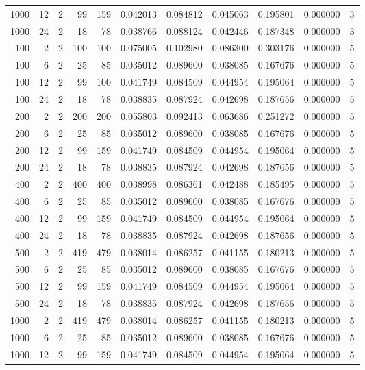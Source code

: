\begin{table}
\begin{tabular}{rrrrrrrrrrr}
1000 & 12 & 2 & 99 & 159 & 0.042013 & 0.084812 & 0.045063 & 0.195801 & 0.000000 & 3 \\
1000 & 24 & 2 & 18 & 78 & 0.038766 & 0.088124 & 0.042446 & 0.187348 & 0.000000 & 3 \\
100 & 2 & 2 & 100 & 100 & 0.075005 & 0.102980 & 0.086300 & 0.303176 & 0.000000 & 5 \\
100 & 6 & 2 & 25 & 85 & 0.035012 & 0.089600 & 0.038085 & 0.167676 & 0.000000 & 5 \\
100 & 12 & 2 & 99 & 100 & 0.041749 & 0.084509 & 0.044954 & 0.195064 & 0.000000 & 5 \\
100 & 24 & 2 & 18 & 78 & 0.038835 & 0.087924 & 0.042698 & 0.187656 & 0.000000 & 5 \\
200 & 2 & 2 & 200 & 200 & 0.055803 & 0.092413 & 0.063686 & 0.251272 & 0.000000 & 5 \\
200 & 6 & 2 & 25 & 85 & 0.035012 & 0.089600 & 0.038085 & 0.167676 & 0.000000 & 5 \\
200 & 12 & 2 & 99 & 159 & 0.041749 & 0.084509 & 0.044954 & 0.195064 & 0.000000 & 5 \\
200 & 24 & 2 & 18 & 78 & 0.038835 & 0.087924 & 0.042698 & 0.187656 & 0.000000 & 5 \\
400 & 2 & 2 & 400 & 400 & 0.038998 & 0.086361 & 0.042488 & 0.185495 & 0.000000 & 5 \\
400 & 6 & 2 & 25 & 85 & 0.035012 & 0.089600 & 0.038085 & 0.167676 & 0.000000 & 5 \\
400 & 12 & 2 & 99 & 159 & 0.041749 & 0.084509 & 0.044954 & 0.195064 & 0.000000 & 5 \\
400 & 24 & 2 & 18 & 78 & 0.038835 & 0.087924 & 0.042698 & 0.187656 & 0.000000 & 5 \\
500 & 2 & 2 & 419 & 479 & 0.038014 & 0.086257 & 0.041155 & 0.180213 & 0.000000 & 5 \\
500 & 6 & 2 & 25 & 85 & 0.035012 & 0.089600 & 0.038085 & 0.167676 & 0.000000 & 5 \\
500 & 12 & 2 & 99 & 159 & 0.041749 & 0.084509 & 0.044954 & 0.195064 & 0.000000 & 5 \\
500 & 24 & 2 & 18 & 78 & 0.038835 & 0.087924 & 0.042698 & 0.187656 & 0.000000 & 5 \\
1000 & 2 & 2 & 419 & 479 & 0.038014 & 0.086257 & 0.041155 & 0.180213 & 0.000000 & 5 \\
1000 & 6 & 2 & 25 & 85 & 0.035012 & 0.089600 & 0.038085 & 0.167676 & 0.000000 & 5 \\
1000 & 12 & 2 & 99 & 159 & 0.041749 & 0.084509 & 0.044954 & 0.195064 & 0.000000 & 5 \\

\end{tabular}
\end{table}
